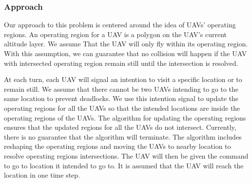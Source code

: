 \documentclass[]{article}
\begin{document}
\subsubsection{Approach}\label{approach}
\begin{figure}[htp]
    \label{fig:ca}
    \caption{}
\end{figure}

Our approach to this problem is centered around the idea of UAVs'
operating regions. An operating region for a UAV is a polygon on the
UAV's current altitude layer. We assume That the UAV will only fly
within its operating region. With this assumption, we can guarantee that
no collision will happen if the UAV with intersected operating region
remain still until the intersection is resolved.


At each turn, each UAV will signal an intention to visit a specific location or to remain still. We assume that there cannot be two UAVs intending to go to the same location to prevent deadlocks. We use this intention signal to update the operating regions for all the UAVs so that the intended locations are inside the operating regions of the UAVs. The algorithm for updating the operating regions ensures that the updated regions for all the UAVs do not intersect. Currently, there is no guarantee that the algorithm will terminate. The algorithm includes reshaping the operating regions and moving the UAVs to nearby location to resolve operating regions intersections. The UAV will then be given the command to go to location it intended to go to. It is assumed that the UAV will reach the location in one time step. 
\end{document}
